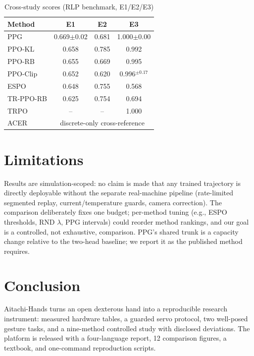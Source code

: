 \documentclass[conference]{IEEEtran}
\begin{document}
\begin{table}[!t]
\caption{Cross-study scores (RLP benchmark, E1/E2/E3)}
\label{tab:cross}
\centering\small
\begin{tabular}{@{}lccc@{}}
\toprule
Method & E1 & E2 & E3 \\
\midrule
PPG & 0.669$\pm$0.02 & 0.681 & 1.000$\pm$0.00 \\
PPO-KL & 0.658 & 0.785 & 0.992 \\
PPO-RB & 0.655 & 0.669 & 0.995 \\
PPO-Clip & 0.652 & 0.620 & 0.996$^{\pm0.17}$ \\
ESPO & 0.648 & 0.755 & 0.568 \\
TR-PPO-RB & 0.625 & 0.754 & 0.694 \\
TRPO & -- & -- & 1.000 \\
ACER & \multicolumn{3}{c}{discrete-only cross-reference} \\
\bottomrule
\end{tabular}
\end{table}

\section{Limitations}
Results are simulation-scoped: no claim is made that any trained trajectory
is directly deployable without the separate real-machine pipeline
(rate-limited segmented replay, current/temperature guards, camera
correction). The comparison deliberately fixes one budget; per-method tuning
(e.g., ESPO thresholds, RND $\lambda$, PPG intervals) could reorder method
rankings, and our goal is a controlled, not exhaustive, comparison. PPG's
shared trunk is a capacity change relative to the two-head baseline; we
report it as the published method requires.

\section{Conclusion}
Aitachi-Hands turns an open dexterous hand into a reproducible research
instrument: measured hardware tables, a guarded servo protocol, two
well-posed gesture tasks, and a nine-method controlled study with disclosed
deviations. The platform is released with a four-language report, 12
comparison figures, a textbook, and one-command reproduction scripts.
\end{document}
